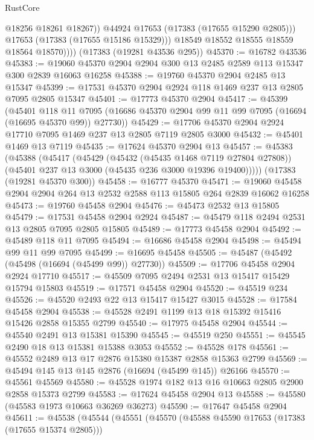 \begin{lexlean}{RustCore}
\begin{coremodule}
                    @18256
                    @18261
                    @18267))
                @44924
                @17653
                (@17383 (@17655 @15290 @2805)))
              @17653
              (@17383 (@17655 @15186 @15329)))
            @18549
            @18552
            @18555
            @18559
            @18564
            @18570))))
    (@17383 (@19281 @43536 @295))
@45370 := @16782 @43536
@45383 := @19060 @45370 @2904 @2904 @300 @13 @2485 @2589 @113 @15347 @300 @2839 @16063 @16258
@45388 := @19760 @45370 @2904 @2485 @13 @15347
@45399 := @17531 @45370 @2904 @2924 @118 @1469 @237 @13 @2805 @7095 @2805 @15347
@45401 := @17773 @45370 @2904
@45417 := @45399
    (@45401
      @118
      @11
      @7095
      (@16686 @45370 @2904 @99 @11 @99 @7095 (@16694 (@16695 @45370 @99)) @27730))
@45429 := @17706 @45370 @2904 @2924 @17710 @7095 @1469 @237 @13 @2805 @7119 @2805 @3000
@45432 := @45401 @1469 @13 @7119
@45435 := @17624 @45370 @2904 @13
@45457 := @45383
    (@45388
      (@45417
        (@45429
          (@45432 (@45435 @1468 @7119 @27804 @27808))
          (@45401 @237 @13 @3000 (@45435 @236 @3000 @19396 @19400)))))
    (@17383 (@19281 @45370 @300))
@45458 := @16777 @45370
@45471 := @19060 @45458 @2904 @2904 @264 @13 @2532 @2588 @113 @15805 @264 @2839 @16062 @16258
@45473 := @19760 @45458 @2904
@45476 := @45473 @2532 @13 @15805
@45479 := @17531 @45458 @2904 @2924
@45487 := @45479 @118 @2494 @2531 @13 @2805 @7095 @2805 @15805
@45489 := @17773 @45458 @2904
@45492 := @45489 @118 @11 @7095
@45494 := @16686 @45458 @2904
@45498 := @45494 @99 @11 @99 @7095
@45499 := @16695 @45458
@45505 := @45487 (@45492 (@45498 (@16694 (@45499 @99)) @27730))
@45509 := @17706 @45458 @2904 @2924 @17710
@45517 := @45509 @7095 @2494 @2531 @13 @15417 @15429 @15794 @15803
@45519 := @17571 @45458 @2904
@45520 := @45519 @234
@45526 := @45520 @2493 @22 @13 @15417 @15427 @3015
@45528 := @17584 @45458 @2904
@45538 := @45528 @2491 @1199 @13 @18 @15392 @15416 @15426 @2858 @15355 @2799
@45540 := @17975 @45458 @2904
@45544 := @45540 @2491 @13 @15381 @15390
@45545 := @45519 @250
@45551 := @45545 @2490 @18 @13 @15381 @15388 @3053
@45552 := @45528 @178
@45561 := @45552 @2489 @13 @17 @2876 @15380 @15387 @2858 @15363 @2799
@45569 := @45494 @145 @13 @145 @2876 (@16694 (@45499 @145)) @26166
@45570 := @45561 @45569
@45580 := @45528 @1974 @182 @13 @16 @10663 @2805 @2900 @2858 @15373 @2799
@45583 := @17624 @45458 @2904 @13
@45588 := @45580 (@45583 @1973 @10663 @36269 @36273)
@45590 := @17647 @45458 @2904
@45611 := @45538
    (@45544
      (@45551
        (@45570
          (@45588 @45590 @17653 (@17383 (@17655 @15374 @2805)))

\end{coremodule}
\end{lexlean}
